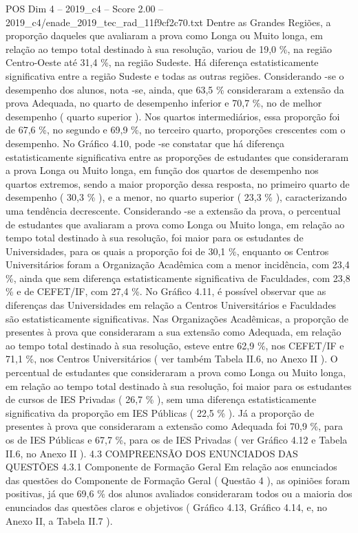 \begin{textsample}{POS Dim 4 – 2019\_c4 – Score 2.00 – 2019\_c4/enade\_2019\_tec\_rad\_11f9cf2c70.txt}
Dentre as Grandes Regiões, a proporção daqueles que avaliaram a prova como Longa ou Muito longa, em relação ao tempo total destinado à sua resolução, variou de 19,0 \%, na região Centro-Oeste até 31,4 \%, na região Sudeste.
Há diferença estatisticamente significativa entre a região Sudeste e todas as outras regiões.
Considerando -se o desempenho dos alunos, nota -se, ainda, que 63,5 \% consideraram a extensão da prova Adequada, no quarto de desempenho inferior e 70,7 \%, no de melhor desempenho ( quarto superior ).
Nos quartos intermediários, essa proporção foi de 67,6 \%, no segundo e 69,9 \%, no terceiro quarto, proporções crescentes com o desempenho.
No Gráfico 4.10, pode -se constatar que há diferença estatisticamente significativa entre as proporções de estudantes que consideraram a prova Longa ou Muito longa, em função dos quartos de desempenho nos quartos extremos, sendo a maior proporção dessa resposta, no primeiro quarto de desempenho ( 30,3 \% ), e a menor, no quarto superior ( 23,3 \% ), caracterizando uma tendência decrescente.
Considerando -se a extensão da prova, o percentual de estudantes que avaliaram a prova como Longa ou Muito longa, em relação ao tempo total destinado à sua resolução, foi maior para os estudantes de Universidades, para os quais a proporção foi de 30,1 \%, enquanto os Centros Universitários foram a Organização Acadêmica com a menor incidência, com 23,4 \%, ainda que sem diferença estatisticamente significativa de Faculdades, com 23,8 \% e de CEFET/IF, com 27,4 \%.
No Gráfico 4.11, é possível observar que as diferenças das Universidades em relação a Centros Universitários e Faculdades são estatisticamente significativas.
Nas Organizações Acadêmicas, a proporção de presentes à prova que consideraram a sua extensão como Adequada, em relação ao tempo total destinado à sua resolução, esteve entre 62,9 \%, nos CEFET/IF e 71,1 \%, nos Centros Universitários ( ver também Tabela II.6, no Anexo II ).
O percentual de estudantes que consideraram a prova como Longa ou Muito longa, em relação ao tempo total destinado à sua resolução, foi maior para os estudantes de cursos de IES Privadas ( 26,7 \% ), sem uma diferença estatisticamente significativa da proporção em IES Públicas ( 22,5 \% ).
Já a proporção de presentes à prova que consideraram a extensão como Adequada foi 70,9 \%, para os de IES Públicas e 67,7 \%, para os de IES Privadas ( ver Gráfico 4.12 e Tabela II.6, no Anexo II ). 4.3 COMPREENSÃO DOS ENUNCIADOS DAS QUESTÕES 4.3.1 Componente de Formação Geral Em relação aos enunciados das questões do Componente de Formação Geral ( Questão 4 ), as opiniões foram positivas, já que 69,6 \% dos alunos avaliados consideraram todos ou a maioria dos enunciados das questões claros e objetivos ( Gráfico 4.13, Gráfico 4.14, e, no Anexo II, a Tabela II.7 ).

\end{textsample}
